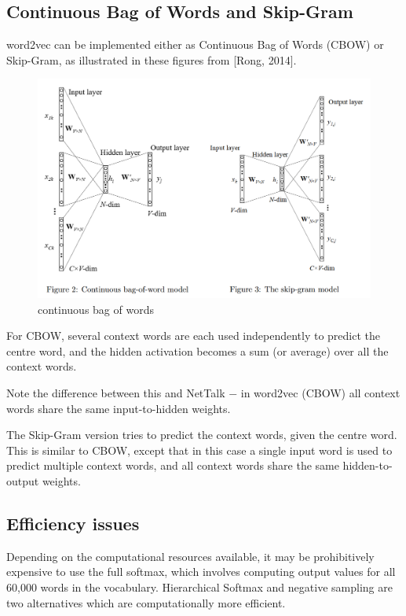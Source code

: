 \documentclass[11pt]{article}
\begin{document}
\subsection{Continuous Bag of Words and Skip-Gram}\label{subsec:continuous-bag-of-words-and-skip-gram}
word2vec can be implemented either as Continuous Bag of Words (CBOW) or Skip-Gram, as illustrated in these figures from [Rong, 2014].

\begin{figure}[H]
    \centering
    \includegraphics{../out/images/continuous-bag-of-words}
    \caption[continuous bag of words]{continuous bag of words}
    \label{fig:continuous bag of words}
\end{figure}

For CBOW, several context words are each used independently to predict the centre word, and the hidden activation becomes a sum (or average) over all the context words.

Note the difference between this and NetTalk $-$ in word2vec (CBOW) all context words share the same input-to-hidden weights.

The Skip-Gram version tries to predict the context words, given the centre word.
This is similar to CBOW, except that in this case a single input word is used to predict multiple context words, and all context words share the same hidden-to-output weights.

\subsection{Efficiency issues}\label{subsec:efficiency-issues}
Depending on the computational resources available, it may be prohibitively expensive to use the full softmax, which involves computing output values for all 60,000 words in the vocabulary.
Hierarchical Softmax and negative sampling are two alternatives which are computationally more efficient.
\end{document}
